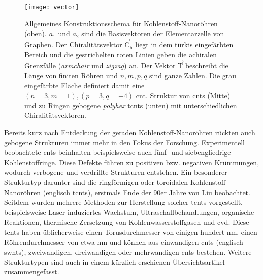 \begin{figure}[ht!]
	\centering
	\texttt{[image: vector]}
	\captionsetup{figurewithin = chapter}
	\captionsetup{font=small, labelfont=bf}\caption[Konstruktionsschema von (toroidalen \textit{polyhex}) Kohlenstoff-Nanoröhren]{Allgemeines Konstruktionsschema für Kohlenstoff-Nanoröhren (oben). $a_1$ und $a_2$ sind die Basisvektoren der Elementarzelle von Graphen. Der Chiralitätsvektor $\vec{\text{C}}_\text{h}$ liegt in dem türkis eingefärbten Bereich und die gestrichelten roten Linien geben die achiralen Grenzfälle (\textit{armchair} und \textit{zigzag}) an. Der Vektor $\vec{\text{T}}$ beschreibt die Länge von finiten Röhren und $n,m,p,q$ sind ganze Zahlen. Die grau eingefärbte Fläche definiert damit eine $(n=3,m=1),(p=3,q=-4)$ \ac{cnt}. Struktur von \acp{cnt} (Mitte) und zu Ringen gebogene \textit{polyhex} \acp{tcnt} (unten) mit unterschiedlichen Chiralitätsvektoren.}
\label{abb:chiralvector}
\end{figure}

Bereits kurz nach Entdeckung der geraden Kohlenstoff-Nanoröhren rückten auch gebogene Strukturen immer mehr in den Fokus der Forschung. Experimentell beobachtete \acp{cnt} beinhalten beispielsweise auch fünf- und siebengliedrige Kohlenstoffringe.\supercite{ichihashi1992pentagons} Diese Defekte führen zu positiven bzw. negativen Krümmungen, wodurch verbogene und verdrillte Strukturen entstehen. Ein besonderer Strukturtyp darunter sind die ringförmigen oder toroidalen Kohlenstoff-Nanoröhren (englisch \acfp{tcnt}), erstmals Ende der 90er Jahre von Liu\supercite{liu1997c} beobachtet. Seitdem wurden mehrere Methoden zur Herstellung solcher \acp{tcnt} vorgestellt, beispielsweise Laser induziertes Wachstum,\supercite{liu1997c} Ultraschallbehandlungen,\supercite{martel1999rings,martel1999ring} organische Reaktionen,\supercite{sano2001ring,geng2008synthesis} thermische Zersetzung von Kohlenwasserstoffgasen\supercite{ahlskog1999ring} und \ac{cvd}\supercite{song2006large,zhou2006ring}. Diese \acp{tcnt} haben üblicherweise einen Torusdurchmesser von einigen hundert nm, einen Röhrendurchmesser von etwa \unit[5-20]{nm} und können aus einwandigen \acp{cnt} (englisch \acp{swnt}),\supercite{martel1999rings,martel1999ring,sano2001ring,geng2008synthesis,komatsu2006ultrasonic,guo2007spontaneously} zweiwandigen,\supercite{colomer2003rings} dreiwandigen\supercite{yu2006rings} oder mehrwandigen\supercite{ahlskog1999ring} \acp{cnt} bestehen. Weitere Strukturtypen sind auch in einem kürzlich erschienen Übersichtsartikel\supercite{liu2014curved} zusammengefasst.

